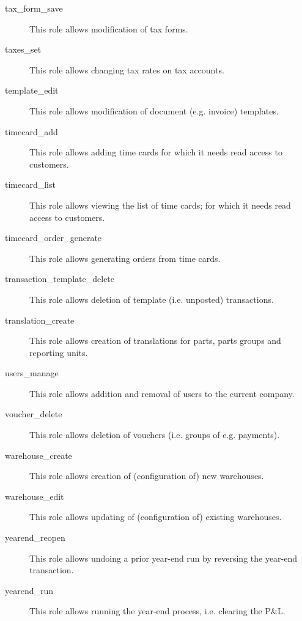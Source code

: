 \begin{description}
\item [tax\_form\_save] \htmlspacing 
                         This role allows modification of tax forms.
\item [taxes\_set] \htmlspacing 
                         This role allows changing tax rates on tax accounts.
\item [template\_edit] \htmlspacing 
                         This role allows modification of document
                         (e.g. invoice) templates.
\item [timecard\_add] \htmlspacing 
                         This role allows adding time cards for which it needs
                         read access to customers.
\item [timecard\_list] \htmlspacing 
                         This role allows viewing the list of time cards;
                         for which it needs read access to customers.
\item [timecard\_order\_generate] \htmlspacing 
                         This role allows generating orders from time cards.
\item [transaction\_template\_delete] \htmlspacing 
                         This role allows deletion of template (i.e. unposted)
                         transactions.
\item [translation\_create] \htmlspacing 
                         This role allows creation of translations for parts,
                         parts groups and reporting units.
\item [users\_manage] \htmlspacing 
                         This role allows addition and removal of users to
                         the current company.
\item [voucher\_delete] \htmlspacing 
                         This role allows deletion of vouchers (i.e. groups of e.g. payments).
\item [warehouse\_create] \htmlspacing 
                         This role allows creation of (configuration of) new warehouses.
\item [warehouse\_edit] \htmlspacing 
                         This role allows updating of (configuration of) existing warehouses.
\item [yearend\_reopen] \htmlspacing 
                         This role allows undoing a prior year-end run by reversing the year-end transaction.
\item [yearend\_run] \htmlspacing 
                         This role allows running the year-end process, i.e. clearing the P\&L.
\end{description}
